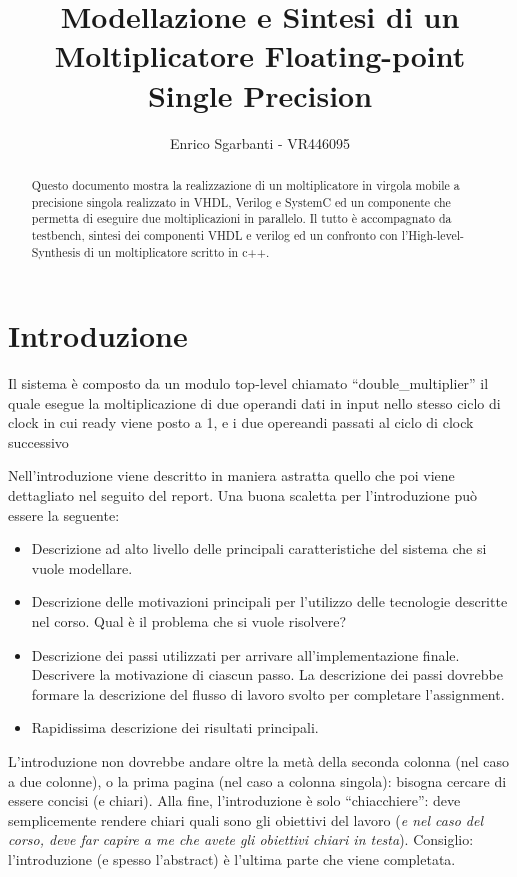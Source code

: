 \documentclass[]{IEEEtran}
\title{Modellazione e Sintesi di un Moltiplicatore Floating-point Single Precision}
\author{Enrico Sgarbanti - VR446095}
\begin{document}
\maketitle


\begin{abstract}
    Questo documento mostra la realizzazione di un moltiplicatore in virgola mobile a precisione singola realizzato in VHDL, Verilog e SystemC ed un componente che permetta di eseguire due moltiplicazioni in parallelo. Il tutto è accompagnato da testbench, sintesi dei componenti VHDL e verilog ed un confronto con l'High-level-Synthesis di un moltiplicatore scritto in c++.
\end{abstract}


\section{Introduzione}
Il sistema è composto da un modulo top-level chiamato ``double\_multiplier'' il quale esegue la moltiplicazione di due operandi dati in input nello stesso ciclo di clock in cui ready viene posto a 1, e i due opereandi passati al ciclo di clock successivo

Nell'introduzione viene descritto in maniera astratta quello che poi viene dettagliato nel seguito del report. Una buona scaletta per l'introduzione può essere la seguente:
\begin{itemize}
    \item Descrizione ad alto livello delle principali caratteristiche del sistema che si vuole modellare.
    \item Descrizione delle motivazioni principali per l'utilizzo delle tecnologie descritte nel corso. Qual è il problema che si vuole risolvere?
    \item Descrizione dei passi utilizzati per arrivare all'implementazione finale. Descrivere la motivazione di ciascun passo. La descrizione dei passi dovrebbe formare la descrizione del flusso di lavoro svolto per completare l'assignment.
    \item Rapidissima descrizione dei risultati principali.
\end{itemize}

L'introduzione non dovrebbe andare oltre la metà della seconda colonna (nel caso a due colonne), o la prima pagina (nel caso a colonna singola): bisogna cercare di essere concisi (e chiari). Alla fine, l'introduzione è solo ``chiacchiere'': deve semplicemente rendere chiari quali sono gli obiettivi del lavoro (\emph{e nel caso del corso, deve far capire a me che avete gli obiettivi chiari in testa}). Consiglio: l'introduzione (e spesso l'abstract) è l'ultima parte che viene completata.
\end{document}
